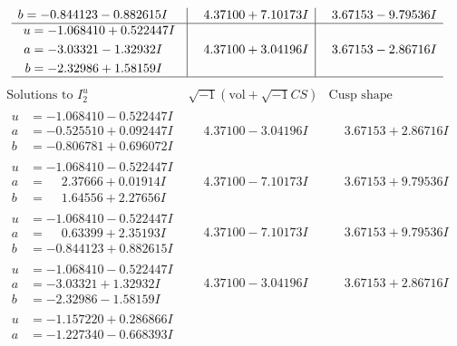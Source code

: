\documentclass[1p]{elsarticle_modified}
\theoremstyle{definition}
\newcommand{\I}{\sqrt{-1}}
\begin{document}
$$\begin{array}{c|c|c}
\begin{aligned}
b &= -0.844123 - 0.882615 I\end{aligned}
 & \phantom{-}4.37100 + 7.10173 I & \phantom{-}3.67153 - 9.79536 I \\ \hline\begin{aligned}
u &= -1.068410 + 0.522447 I \\
a &= -3.03321 - 1.32932 I \\
b &= -2.32986 + 1.58159 I\end{aligned}
 & \phantom{-}4.37100 + 3.04196 I & \phantom{-}3.67153 - 2.86716 I\\
 \hline 
 \end{array}$$\newpage$$\begin{array}{c|c|c}  
\text{Solutions to }I^u_{2}& \I (\text{vol} + \sqrt{-1}CS) & \text{Cusp shape}\\
 \hline 
\begin{aligned}
u &= -1.068410 - 0.522447 I \\
a &= -0.525510 + 0.092447 I \\
b &= -0.806781 + 0.696072 I\end{aligned}
 & \phantom{-}4.37100 - 3.04196 I & \phantom{-}3.67153 + 2.86716 I \\ \hline\begin{aligned}
u &= -1.068410 - 0.522447 I \\
a &= \phantom{-}2.37666 + 0.01914 I \\
b &= \phantom{-}1.64556 + 2.27656 I\end{aligned}
 & \phantom{-}4.37100 - 7.10173 I & \phantom{-}3.67153 + 9.79536 I \\ \hline\begin{aligned}
u &= -1.068410 - 0.522447 I \\
a &= \phantom{-}0.63399 + 2.35193 I \\
b &= -0.844123 + 0.882615 I\end{aligned}
 & \phantom{-}4.37100 - 7.10173 I & \phantom{-}3.67153 + 9.79536 I \\ \hline\begin{aligned}
u &= -1.068410 - 0.522447 I \\
a &= -3.03321 + 1.32932 I \\
b &= -2.32986 - 1.58159 I\end{aligned}
 & \phantom{-}4.37100 - 3.04196 I & \phantom{-}3.67153 + 2.86716 I \\ \hline\begin{aligned}
u &= -1.157220 + 0.286866 I \\
a &= -1.227340 - 0.668393 I \\

\end{aligned}
\end{array}$$
\end{document}
